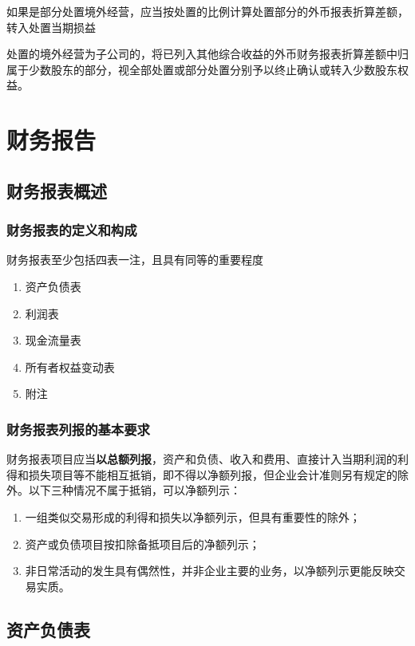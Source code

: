 \documentclass[UTF8,12pt]{ctexart}
\numberwithin{equation}{section} %
\numberwithin{figure}{section}
\numberwithin{table}{section}
\begin{document}
	如果是部分处置境外经营，应当按处置的比例计算处置部分的外币报表折算差额，转入处置当期损益
	
	处置的境外经营为子公司的，将已列入其他综合收益的外币财务报表折算差额中归属于少数股东的部分，视全部处置或部分处置分别予以终止确认或转入少数股东权益。
	
	\newpage
	\section{财务报告}
	
	\subsection{财务报表概述}
	\subsubsection{财务报表的定义和构成}
	财务报表至少包括四表一注，且具有同等的重要程度
	\begin{enumerate}
		\item 资产负债表
		
		\item 利润表
		
		\item 现金流量表
		
		\item 所有者权益变动表
		
		\item 附注
	\end{enumerate}
	\subsubsection{财务报表列报的基本要求}
	财务报表项目应当\textbf{以总额列报}，资产和负债、收入和费用、直接计入当期利润的利得和损失项目等不能相互抵销，即不得以净额列报，但企业会计准则另有规定的除外。以下三种情况不属于抵销，可以净额列示：
	\begin{enumerate}
		\item 一组类似交易形成的利得和损失以净额列示，但具有重要性的除外；
		
		\item 资产或负债项目按扣除备抵项目后的净额列示；
		
		\item 非日常活动的发生具有偶然性，并非企业主要的业务，以净额列示更能反映交易实质。
	\end{enumerate}
	
	\subsection{资产负债表}
\end{document}
